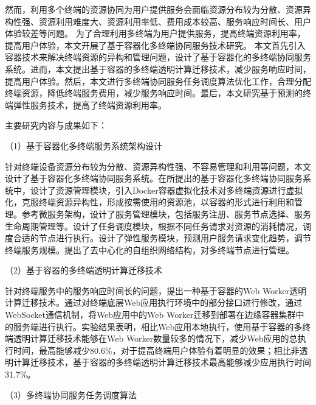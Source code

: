 然而，利用多个终端的资源协同为用户提供服务会面临资源分布较为分散、资源异构性强、资源利用难度大、资源利用率低、费用成本较高、服务响应时间长、用户体验较差等问题。
为了合理利用多终端为用户提供服务，提高终端资源利用率，提高用户体验，本文开展了基于容器化多终端协同服务技术研究。
本文首先引入容器技术来解决终端资源的异构和管理问题，设计了基于容器化的多终端协同服务系统。进而，本文提出基于容器的多终端透明计算迁移技术，减少服务响应时间，提高用户体验。然后，本文进行多终端协同服务任务调度算法优化工作，合理分配终端资源，降低终端服务费用，减少服务响应时间。最后，本文研究基于预测的终端弹性服务技术，提高了终端资源利用率。

主要研究内容与成果如下： 

（1）基于容器化多终端服务系统架构设计

针对终端设备资源分布较为分散、资源异构性强、不容易管理和利用等问题，本文设计了基于容器化多终端协同服务系统。在所提出的基于容器化多终端协同服务系统中，设计了资源管理模块，引入Docker容器虚拟化技术对多终端资源进行虚拟化，克服终端资源异构性，形成按需使用的资源池，以容器的形式进行利用和管理。参考微服务架构，设计了服务管理模块，包括服务注册、服务节点选择、服务生命周期管理等。设计了任务调度模块，根据不同任务请求对资源的消耗情况，调度合适的节点进行执行。设计了弹性服务模块，预测用户服务请求变化趋势，调节终端服务规模。提出了去中心化的自组织网络结构，对多终端节点进行管理。

（2）基于容器的多终端透明计算迁移技术

针对终端服务中的服务响应时间长的问题，提出一种基于容器的Web Worker透明计算迁移技术。通过对终端底层Web应用执行环境中的部分接口进行修改，通过WebSocket通信机制，将Web应用中的Web Worker迁移到部署在边缘容器集群中的服务端进行执行。实验结果表明，相比Web应用本地执行，使用基于容器的多终端透明计算迁移技术能够在Web Worker数量较多的情况下，减少Web应用的总执行时间，最高能够减少80.6\%，对于提高终端用户体验有着明显的效果；相比非透明计算迁移技术，基于容器的多终端透明计算迁移技术最高能够减少应用执行时间31.7\%。

（3）多终端协同服务任务调度算法 

